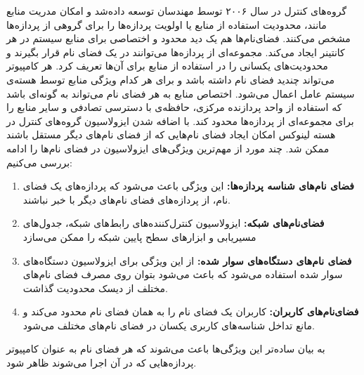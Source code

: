      گروه‌های کنترل در سال ۲۰۰۶ توسط مهندسان  توسعه داده‌شد و امکان مدریت منابع مانند، محدودیت استفاده از منابع یا اولویت پردازه‌ها را برای گروهی از پردازه‌ها مشخص می‌کنند.
      فضای‌نام‌ها هم یک دید محدود و اختصاصی برای منابع سیستم در هر کانتینر ایجاد می‌کند.
      مجموعه‌ای از پردازه‌ها می‌توانند در یک فضای نام قرار بگیرند و محدودیت‌های یکسانی را در استفاده از منابع برای آن‌ها تعریف کرد.
      هر کامپیوتر می‌تواند چندید فضای نام داشته باشد و برای هر کدام ویژگی منابع توسط هسته‌ی سیستم عامل اعمال می‌شود.
      اختصاص منابع به هر فضای نام می‌تواند به گونه‌ای باشد که استفاده از واحد پردازنده مرکزی، حافظه‌ی با دسترسی تصادفی و سایر منابع را برای مجموعه‌ای از پردازه‌ها محدود کند.
      با اضافه شدن ایزولاسیون گروه‌های کنترل در هسته لینوکس امکان ایجاد فضای نام‌هایی که از فضای نام‌های دیگر مستقل باشند ممکن شد.
      چند مورد از مهم‌ترین ویژگی‌های ایزولاسیون در فضای نام‌ها را ادامه بررسی می‌کنیم:
      \begin{enumerate}
        \item \textbf{فضای نام‌های شناسه پردازه‌ها:} این ویژگی باعث می‌شود که پردازه‌های یک فضای نام، از پردازه‌های فضای نام‌های دیگر با خبر نباشند.
        \item \textbf{فضای‌نام‌های شبکه:} ایزولاسیون کنترل‌کننده‌های رابط‌های‌ شبکه، جدول‌های مسیریابی و ابزار‌های سطح پایین شبکه را ممکن می‌سازد
        \item \textbf{فضای نام‌های دستگاه‌های سوار شده:} از این ویژگی برای ایزولاسیون دستگاه‌های سوار شده استفاده می‌شود که باعث می‌شود بتوان روی مصرف فضای نام‌های مختلف از دیسک محدودیت گذاشت.
        \item \textbf{فضای‌نام‌های کاربران:} کاربران یک فضای نام را به همان فضای نام محدود می‌کند و مانع تداخل شناسه‌های کاربری یکسان در فضای نام‌های مختلف می‌شود.
      \end{enumerate}
      به بیان ساده‌تر این ویژگی‌ها باعث می‌شوند که هر فضای نام به عنوان کامپیوتر پردازه‌هایی که در آن اجرا می‌شوند ظاهر شود.

